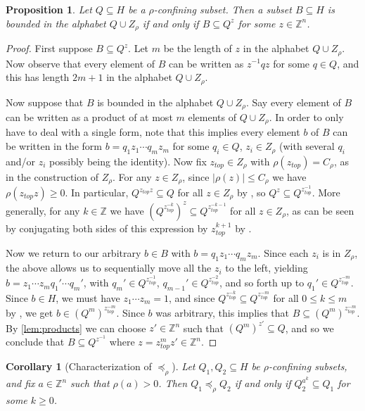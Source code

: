 \documentclass[reqno,12pt]{amsart}\setcounter{tocdepth}{1}
\newtheorem{proposition}[theorem]{Proposition}
\newtheorem{corollary}[theorem]{Corollary}
\theoremstyle{definition}
\newcommand{\Z}{\mathbb{Z}}
\numberwithin{equation}{section}
\begin{document}
\begin{proposition}\label{prop:conj_is_all}
Let $Q\subseteq H$ be a $\rho$-confining subset. Then a subset $B\subseteq H$ is bounded in the alphabet $Q\cup Z_\rho$ if and only if $B \subseteq Q^z$ for some $z \in \Z^n$.
\end{proposition}

\begin{proof}
First suppose $B \subseteq Q^z$. Let $m$ be the length of $z$ in the alphabet $Q\cup Z_\rho$. Now observe that every element of $B$ can be written as $z^{-1}qz$ for some $q\in Q$, and this has length $2m+1$ in the alphabet $Q\cup Z_\rho$.

Now suppose that $B$ is bounded in the alphabet $Q\cup Z_\rho$. Say every element of $B$ can be written as a product of at most $m$ elements of $Q\cup Z_\rho$. In order to only have to deal with a single form, note that this implies every element $b$ of $B$ can be written in the form $b=q_1 z_1\cdots q_m z_m$ for some $q_i\in Q$, $z_i\in Z_\rho$ (with several $q_i$ and/or $z_i$ possibly being the identity).
Now fix $z_{top}\in Z_\rho$ with $\rho(z_{top})=C_\rho$, as in the construction of $Z_\rho$. For any $z\in Z_\rho$, since $|\rho(z)|\le C_\rho$ we have $\rho(z_{top} z)\ge 0$. In particular, $Q^{z_{top} z}\subseteq Q$ for all $z\in Z_\rho$ by \StayInConf, so $Q^z\subseteq Q^{z_{top}^{-1}}$.
More generally, for any $k \in \Z$ we have $(Q^{z_{top}^{-k}})^z\subseteq Q^{z_{top}^{-k-1}}$ for all $z\in Z_\rho$, as can be seen by conjugating both sides of this expression by $z_{top}^{k+1}$ by \StayInConf.


Now we return to our arbitrary $b\in B$ with $b=q_1 z_1\cdots q_m z_m$. Since each $z_i$ is in $Z_\rho$, the above allows us to sequentially move all the $z_i$ to the left, yielding $b=z_1\cdots z_m q_1'\cdots q_m'$, with $q_m'\in Q^{z_{top}^{-1}}$, $q_{m-1}'\in Q^{z_{top}^{-2}}$, and so forth up to $q_1'\in Q^{z_{top}^{-m}}$. Since $b\in H$, we must have $z_1\cdots z_m=1$, and since $Q^{z_{top}^{-k}}\subseteq Q^{z_{top}^{-m}}$ for all $0\le k\le m$ by \StayInConf, we get $b\in (Q^m)^{z_{top}^{-m}}$. Since $b$ was arbitrary, this implies that $B\subseteq (Q^m)^{z_{top}^{-m}}$. By \cref{lem:products} we can choose $z' \in \Z^n$ such that $(Q^m)^{z'}\subseteq Q$, and so we conclude that $B\subseteq Q^{z^{-1}}$ where $z =  z_{top}^mz' \in \Z^n$.
\end{proof}

\begin{corollary}[Characterization of $\preceq_\rho$]\label{cor:conjugate}
Let $Q_1,Q_2\subseteq H$ be $\rho$-confining subsets, and fix $a \in \Z^n$ such that $\rho(a) > 0$. Then $Q_1 \preceq_\rho Q_2$ if and only if $Q_2^{a^k} \subseteq Q_1$ for some $k \geq 0$.
\end{corollary}
\end{document}
